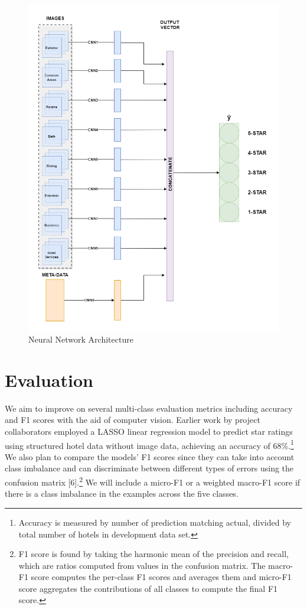 \documentclass{article}
\begin{document}
\begin{figure}[htp]
    \centering
    \includegraphics[width=14cm]{Architecture.png}
    \caption{Neural Network Architecture}
    \label{fig:architecture}
    \end{figure}

\section{Evaluation}
We aim to improve on several multi-class evaluation metrics including accuracy and F1 scores with the aid of computer vision. Earlier work by project collaborators employed a LASSO linear regression model to predict star ratings using structured hotel data without image data, achieving an accuracy of 68\%.\footnote{Accuracy is measured by number of prediction matching actual, divided by total number of hotels in development data set.} We also plan to compare the models' F1 scores since they can take into account class imbalance and can discriminate between different types of errors using the confusion matrix [6].\footnote{F1 score is found by taking the harmonic mean of the precision and recall, which are ratios computed from values in the confusion matrix. The macro-F1 score computes the per-class F1 scores and averages them and micro-F1 score aggregates the contributions of all classes to compute the final F1 score.} We will include a micro-F1 or a weighted macro-F1 score if there is a class imbalance in the examples across the five classes. 
\end{document}
